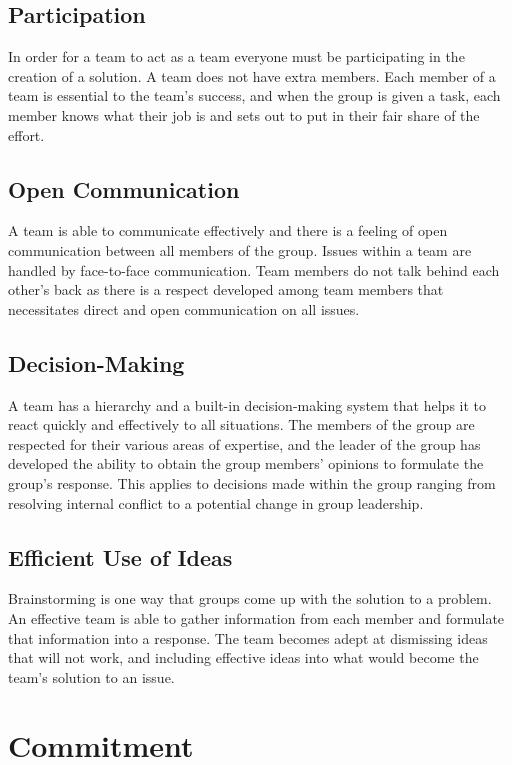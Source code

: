 \documentclass{article}\usepackage[]{graphicx}\usepackage[]{color}
\begin{document}
\subsection{Participation}
In order for a team to act as a team everyone must be participating in the creation of a solution. A team does not have extra members. Each member of a team is essential to the team's success, and when the group is given a task, each member knows what their job is and sets out to put in their fair share of the effort.

\subsection{Open Communication}
A team is able to communicate effectively and there is a feeling of open communication between all members of the group. Issues within a team are handled by face-to-face communication. Team members do not talk behind each other's back as there is a respect developed among team members that necessitates direct and open communication on all issues.

\subsection{Decision-Making}
A team has a hierarchy and a built-in decision-making system that helps it to react quickly and effectively to all situations. The members of the group are respected for their various areas of expertise, and the leader of the group has developed the ability to obtain the group members' opinions to formulate the group's response. This applies to decisions made within the group ranging from resolving internal conflict to a potential change in group leadership.

\subsection{Efficient Use of Ideas}

Brainstorming is one way that groups come up with the solution to a problem. An effective team is able to gather information from each member and formulate that information into a response. The team becomes adept at dismissing ideas that will not work, and including effective ideas into what would become the team's solution to an issue.


\section{Commitment}
\end{document}
